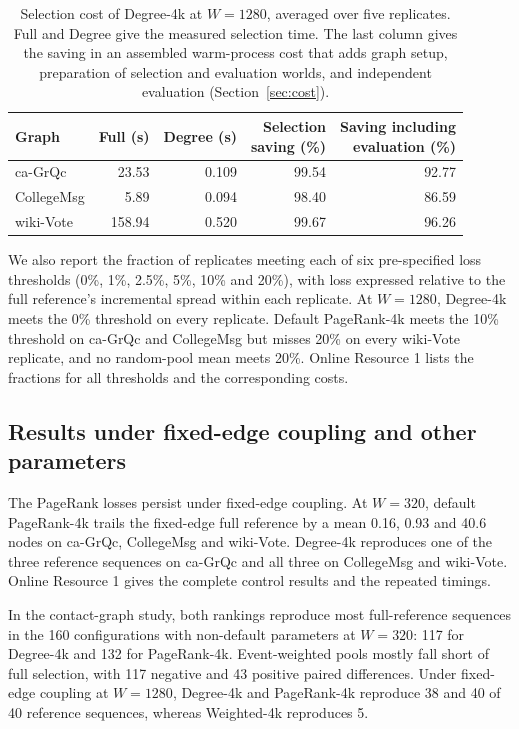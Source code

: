\documentclass[smallextended]{svjour3}
\begin{document}
\begin{table}[htbp]
\caption{Selection cost of Degree-4k at $W=1280$, averaged over five replicates. Full and Degree give the measured selection time. The last column gives the saving in an assembled warm-process cost that adds graph setup, preparation of selection and evaluation worlds, and independent evaluation (Section~\ref{sec:cost}).}\label{tab:cost}
\begin{tabular}{lrrrr}
\toprule
Graph & Full (s) & Degree (s) & \shortstack{Selection\\saving (\%)} & \shortstack{Saving including\\evaluation (\%)} \\
\midrule
ca-GrQc & 23.53 & 0.109 & 99.54 & 92.77 \\
CollegeMsg & 5.89 & 0.094 & 98.40 & 86.59 \\
wiki-Vote & 158.94 & 0.520 & 99.67 & 96.26 \\
\bottomrule
\end{tabular}
\end{table}

We also report the fraction of replicates meeting each of six pre-specified loss thresholds (0\%, 1\%, 2.5\%, 5\%, 10\% and 20\%), with loss expressed relative to the full reference's incremental spread within each replicate. At $W=1280$, Degree-4k meets the 0\% threshold on every replicate. Default PageRank-4k meets the 10\% threshold on ca-GrQc and CollegeMsg but misses 20\% on every wiki-Vote replicate, and no random-pool mean meets 20\%. Online Resource 1 lists the fractions for all thresholds and the corresponding costs.

\subsection{Results under fixed-edge coupling and other parameters}
The PageRank losses persist under fixed-edge coupling. At $W=320$, default PageRank-4k trails the fixed-edge full reference by a mean 0.16, 0.93 and 40.6 nodes on ca-GrQc, CollegeMsg and wiki-Vote. Degree-4k reproduces one of the three reference sequences on ca-GrQc and all three on CollegeMsg and wiki-Vote. Online Resource 1 gives the complete control results and the repeated timings.

In the contact-graph study, both rankings reproduce most full-reference sequences in the 160 configurations with non-default parameters at $W=320$: 117 for Degree-4k and 132 for PageRank-4k. Event-weighted pools mostly fall short of full selection, with 117 negative and 43 positive paired differences. Under fixed-edge coupling at $W=1280$, Degree-4k and PageRank-4k reproduce 38 and 40 of 40 reference sequences, whereas Weighted-4k reproduces 5.
\FloatBarrier
\end{document}
